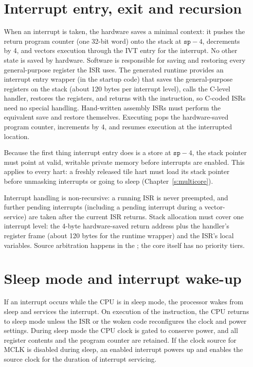 \documentclass[11pt,pdftex,openany,letterpaper]{report}
\begin{document}
\section{Interrupt entry, exit and recursion}

When an interrupt is taken, the hardware saves a minimal context: it pushes the return program counter (one 32-bit word) onto the stack at $\mathtt{sp}-4$, decrements  by 4, and vectors execution through the IVT entry for the interrupt. No other state is saved by hardware. Software is responsible for saving and restoring every general-purpose register the ISR uses. The generated runtime provides an interrupt entry wrapper (in the startup code) that saves the general-purpose registers on the stack (about 120 bytes per interrupt level), calls the C-level handler, restores the registers, and returns with the  instruction, so C-coded ISRs need no special handling. Hand-written assembly ISRs must perform the equivalent save and restore themselves. Executing  pops the hardware-saved program counter, increments  by 4, and resumes execution at the interrupted location.

\begin{Caution}
Because the first thing interrupt entry does is a store at $\mathtt{sp}-4$, the stack pointer must point at valid, writable private memory before interrupts are enabled. This applies to every hart: a freshly released tile hart must load its stack pointer before unmasking interrupts or going to sleep (Chapter~\ref{s:multicore}).
\end{Caution}

Interrupt handling is non-recursive: a running ISR is never preempted, and further pending interrupts (including a pending  interrupt during a vector-\MeipVector{} service) are taken after the current ISR returns. Stack allocation must cover one interrupt level: the 4-byte hardware-saved return address plus the handler's register frame (about 120 bytes for the runtime wrapper) and the ISR's local variables. Source arbitration happens in the ; the core itself has no priority tiers.

\section{Sleep mode and interrupt wake-up}

If an interrupt occurs while the CPU is in sleep mode, the processor wakes from sleep and services the interrupt. On execution of the  instruction, the CPU returns to sleep mode unless the ISR or the woken code reconfigures the clock and power settings. During sleep mode the CPU clock is gated to conserve power, and all register contents and the program counter are retained. If the clock source for MCLK is disabled during sleep, an enabled interrupt powers up and enables the source clock for the duration of interrupt servicing.
\end{document}
